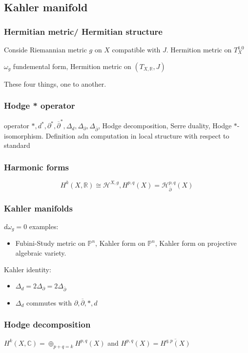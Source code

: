 \documentclass{article}
\begin{document}
\subsection{Kahler manifold}
\subsubsection{Hermitian metric/ Hermitian structure}
Conside Riemannian metric $ g $ on $ X $ compatible with $J$. Hermition metric on $ T^{1.0}_{X} $

$ \omega_{g} $ fundemental form, Hermition metric on $ (T_{X,\mathbb{R}},J) $

These four things, one to another.
\subsubsection{Hodge * operator}
operator $ *, d^{*},\partial^{*}, \overline{\partial}^{*} , \Delta_{d}, \Delta_{\partial},\Delta_{ \overline{\partial}} $, Hodge decomposition, Serre duality, Hodge $ * $-isomorphism.
Definition adn computation in local structure with respect to standard

\subsubsection{Harmonic forms}
\[
  H^{k}(X,\mathbb{R})\cong \mathcal{H}^{X,g}, H^{p,q}(X)= \mathcal{H}^{p,q}_{ \overline{\partial}}(X) 
\]

\subsubsection{Kahler manifolds}
$ d\omega_{g}=0 $
examples:
\begin{itemize}
  \item Fubini-Study metric on $ \mathbb{P}^{n} $, Kahler form on $ \mathbb{P}^{n} $, Kahler form on projective algebraic variety.
\end{itemize}
Kahler identity:
\begin{itemize}
  \item $ \Delta_{d}=2\Delta_{\partial}=2\Delta_{ \overline{\partial}} $
  \item $ \Delta_{d} $ commutes with $ \partial, \overline{\partial}, *, d $
\end{itemize}
\subsubsection{Hodge decomposition}
$ H^{k}(X,\mathbb{C})= \oplus_{p+q=k}H^{p,q}(X) $ and $ H^{p,q}(X)= \overline{H^{q,p}(X)} $
\end{document}
